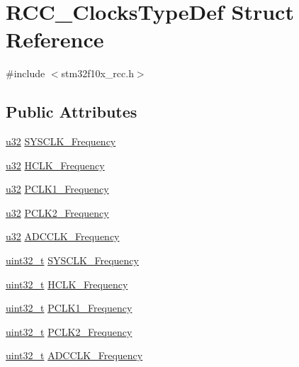\hypertarget{struct_r_c_c___clocks_type_def}{}\section{R\+C\+C\+\_\+\+Clocks\+Type\+Def Struct Reference}
\label{struct_r_c_c___clocks_type_def}


{\ttfamily \#include $<$stm32f10x\+\_\+rcc.\+h$>$}

\subsection*{Public Attributes}
\begin{DoxyCompactItemize}
\item 
\hyperlink{agilefox_2library_2inc_2stm32f10x__type_8h_a2caf5cd7bcdbe1eefa727f44ffb10bac}{u32} \hyperlink{struct_r_c_c___clocks_type_def_a3a220a6c71158f4bac6f13cabdc2ee2d}{S\+Y\+S\+C\+L\+K\+\_\+\+Frequency}
\item 
\hyperlink{agilefox_2library_2inc_2stm32f10x__type_8h_a2caf5cd7bcdbe1eefa727f44ffb10bac}{u32} \hyperlink{struct_r_c_c___clocks_type_def_afd09fa4f2e7da560accb159fab2c421b}{H\+C\+L\+K\+\_\+\+Frequency}
\item 
\hyperlink{agilefox_2library_2inc_2stm32f10x__type_8h_a2caf5cd7bcdbe1eefa727f44ffb10bac}{u32} \hyperlink{struct_r_c_c___clocks_type_def_a6346339e3650155409d5c97ad88cdb06}{P\+C\+L\+K1\+\_\+\+Frequency}
\item 
\hyperlink{agilefox_2library_2inc_2stm32f10x__type_8h_a2caf5cd7bcdbe1eefa727f44ffb10bac}{u32} \hyperlink{struct_r_c_c___clocks_type_def_a393ec59f4d03bc5ad678cf4f7d68b8f5}{P\+C\+L\+K2\+\_\+\+Frequency}
\item 
\hyperlink{agilefox_2library_2inc_2stm32f10x__type_8h_a2caf5cd7bcdbe1eefa727f44ffb10bac}{u32} \hyperlink{struct_r_c_c___clocks_type_def_a19aad23ee1910372dd8e6c563010dcbb}{A\+D\+C\+C\+L\+K\+\_\+\+Frequency}
\item 
\hyperlink{_p_e___types_8h_a33594304e786b158f3fb30289278f5af}{uint32\+\_\+t} \hyperlink{struct_r_c_c___clocks_type_def_a2ba325067f3d464ad7955358932563d8}{S\+Y\+S\+C\+L\+K\+\_\+\+Frequency}
\item 
\hyperlink{_p_e___types_8h_a33594304e786b158f3fb30289278f5af}{uint32\+\_\+t} \hyperlink{struct_r_c_c___clocks_type_def_a41b9859d33954117daf7fab42f804b92}{H\+C\+L\+K\+\_\+\+Frequency}
\item 
\hyperlink{_p_e___types_8h_a33594304e786b158f3fb30289278f5af}{uint32\+\_\+t} \hyperlink{struct_r_c_c___clocks_type_def_add4cfc63c35178d187107edc764e0b8f}{P\+C\+L\+K1\+\_\+\+Frequency}
\item 
\hyperlink{_p_e___types_8h_a33594304e786b158f3fb30289278f5af}{uint32\+\_\+t} \hyperlink{struct_r_c_c___clocks_type_def_ad854f0b70a6c4cf6de6dbbdcbc99b856}{P\+C\+L\+K2\+\_\+\+Frequency}
\item 
\hyperlink{_p_e___types_8h_a33594304e786b158f3fb30289278f5af}{uint32\+\_\+t} \hyperlink{struct_r_c_c___clocks_type_def_aa3dad8af3bb364b6232cf5446d478e7d}{A\+D\+C\+C\+L\+K\+\_\+\+Frequency}
\end{DoxyCompactItemize}


